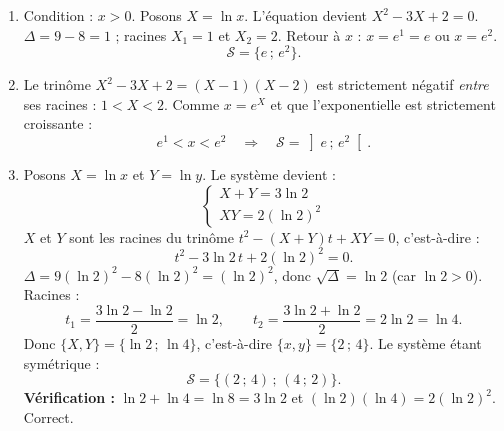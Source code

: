 \documentclass[11pt]{article}
\begin{document}
\begin{corrige}[Exercice 6 — Inconnue auxiliaire $X=\ln x$]
\begin{enumerate}
\item Condition : $x>0$. Posons $X=\ln x$. L'équation devient $X^2-3X+2=0$. $\Delta=9-8=1$ ; racines $X_1=1$ et $X_2=2$. Retour à $x$ : $x=e^1=e$ ou $x=e^2$.
\[ \mathcal{S}=\{e\,;\,e^2\}. \]
\item Le trinôme $X^2-3X+2=(X-1)(X-2)$ est strictement négatif \emph{entre} ses racines : $1<X<2$. Comme $x=e^X$ et que l'exponentielle est strictement croissante :
\[ e^1<x<e^2 \quad\Longrightarrow\quad \mathcal{S}=\left]e\,;\,e^2\right[. \]
\item Posons $X=\ln x$ et $Y=\ln y$. Le système devient :
\[ \begin{cases} X+Y=3\ln 2 \\ XY=2(\ln 2)^2 \end{cases} \]
$X$ et $Y$ sont les racines du trinôme $t^2-(X+Y)t+XY=0$, c'est-à-dire :
\[ t^2-3\ln 2\,t+2(\ln 2)^2=0. \]
$\Delta=9(\ln 2)^2-8(\ln 2)^2=(\ln 2)^2$, donc $\sqrt{\Delta}=\ln 2$ (car $\ln 2>0$). Racines :
\[ t_1=\dfrac{3\ln 2-\ln 2}{2}=\ln 2, \qquad t_2=\dfrac{3\ln 2+\ln 2}{2}=2\ln 2=\ln 4. \]
Donc $\{X,Y\}=\{\ln 2\,;\,\ln 4\}$, c'est-à-dire $\{x,y\}=\{2\,;\,4\}$. Le système étant symétrique :
\[ \mathcal{S}=\{(2\,;\,4)\,;\,(4\,;\,2)\}. \]
\textbf{Vérification :} $\ln 2+\ln 4=\ln 8=3\ln 2$ et $(\ln 2)(\ln 4)=2(\ln 2)^2$. Correct.
\end{enumerate}
\end{corrige}
\end{document}
